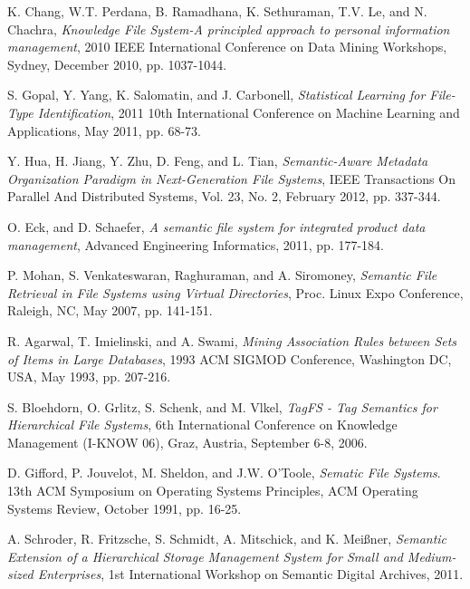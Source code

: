 \begin{thebibliography}{99}


K. Chang, W.T. Perdana, B. Ramadhana, K. Sethuraman, T.V. Le, and N. Chachra, 
\emph{Knowledge File System-A principled approach to personal information management},
2010 IEEE International Conference on Data Mining Workshops, Sydney, December 2010, pp. 1037-1044.

S. Gopal, Y. Yang, K. Salomatin, and J. Carbonell, 
\emph{Statistical Learning for File-Type Identification}, 
2011 10th International Conference on Machine Learning and Applications, May 2011, pp. 68-73.

Y. Hua, H. Jiang, Y. Zhu, D. Feng, and L. Tian, 
\emph{Semantic-Aware Metadata Organization Paradigm in Next-Generation File Systems}, 
IEEE Transactions On Parallel And Distributed Systems, Vol. 23, No. 2, February 2012, pp. 337-344.

O. Eck, and D. Schaefer, 
\emph{A semantic file system for integrated product data management}, Advanced Engineering Informatics, 2011, pp. 177-184.

P. Mohan, S. Venkateswaran, Raghuraman, and A. Siromoney, 
\emph{Semantic File Retrieval in File Systems using Virtual Directories},
Proc. Linux Expo Conference, Raleigh, NC, May 2007, pp. 141-151.

R. Agarwal, T. Imielinski, and A. Swami, 
\emph{Mining Association Rules between Sets of Items in Large Databases}, 1993 ACM SIGMOD Conference, Washington DC, USA, May 1993, pp. 207-216.

S. Bloehdorn, O. Grlitz, S. Schenk, and M. Vlkel, 
\emph{TagFS - Tag Semantics for Hierarchical File Systems},
6th International Conference on Knowledge Management (I-KNOW 06), Graz, Austria, September 6-8, 2006.

D. Gifford, P. Jouvelot, M. Sheldon, and J.W. O'Toole, \emph{Sematic File Systems}. 
13th ACM Symposium on Operating Systems Principles, ACM Operating Systems Review, October 1991, pp. 16-25.

A. Schroder, R. Fritzsche, S. Schmidt, A. Mitschick, and K. Meißner, 
\emph{Semantic Extension of a Hierarchical Storage Management System for Small and Medium-sized Enterprises},
1st International Workshop on Semantic Digital Archives, 2011.


\end{thebibliography}
